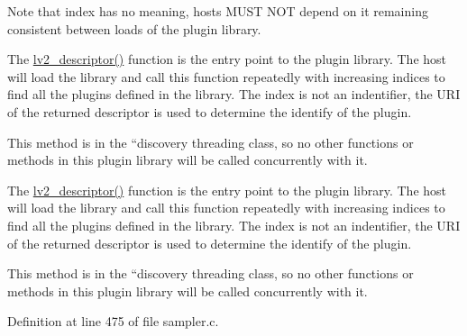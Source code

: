 Note that {\ttfamily index} has no meaning, hosts M\+U\+ST N\+OT depend on it remaining consistent between loads of the plugin library.

The \hyperlink{amp_8c_affedc7aabe2715522365f21a9c1ff65d}{lv2\+\_\+descriptor()} function is the entry point to the plugin library. The host will load the library and call this function repeatedly with increasing indices to find all the plugins defined in the library. The index is not an indentifier, the U\+RI of the returned descriptor is used to determine the identify of the plugin.

This method is in the ``discovery\textquotesingle{}\textquotesingle{} threading class, so no other functions or methods in this plugin library will be called concurrently with it.

The {\ttfamily \hyperlink{amp_8c_affedc7aabe2715522365f21a9c1ff65d}{lv2\+\_\+descriptor()}} function is the entry point to the plugin library. The host will load the library and call this function repeatedly with increasing indices to find all the plugins defined in the library. The index is not an indentifier, the U\+RI of the returned descriptor is used to determine the identify of the plugin.

This method is in the ``discovery\textquotesingle{}\textquotesingle{} threading class, so no other functions or methods in this plugin library will be called concurrently with it. 

Definition at line 475 of file sampler.\+c.

